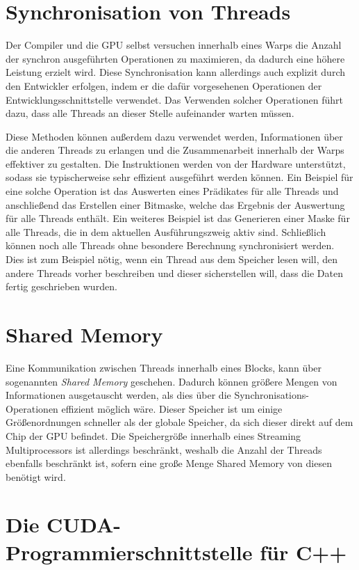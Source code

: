 \section{Synchronisation von Threads}

Der Compiler und die GPU selbst versuchen innerhalb eines Warps die Anzahl der synchron ausgeführten Operationen zu maximieren, da dadurch eine höhere Leistung erzielt wird. \cite{Nickolls2009}
Diese Synchronisation kann allerdings auch explizit durch den Entwickler erfolgen, indem er die dafür vorgesehenen Operationen der Entwicklungsschnittstelle verwendet.
Das Verwenden solcher Operationen führt dazu, dass alle Threads an dieser Stelle aufeinander warten müssen.

Diese Methoden können außerdem dazu verwendet werden, Informationen über die anderen Threads zu erlangen und die Zusammenarbeit innerhalb der Warps effektiver zu gestalten.
Die Instruktionen werden von der Hardware unterstützt, sodass sie typischerweise sehr effizient ausgeführt werden können.
Ein Beispiel für eine solche Operation ist das Auswerten eines Prädikates für alle Threads und anschließend das Erstellen einer Bitmaske, welche das Ergebnis der Auswertung für alle Threads enthält.
Ein weiteres Beispiel ist das Generieren einer Maske für alle Threads, die in dem aktuellen Ausführungszweig aktiv sind.
Schließlich können noch alle Threads ohne besondere Berechnung synchronisiert werden.
Dies ist zum Beispiel nötig, wenn ein Thread aus dem Speicher lesen will, den andere Threads vorher beschreiben und dieser sicherstellen will, dass die Daten fertig geschrieben wurden. \cite{Lin2018}

\section{Shared Memory}

Eine Kommunikation zwischen Threads innerhalb eines Blocks, kann über sogenannten \emph{Shared Memory} geschehen.
Dadurch können größere Mengen von Informationen ausgetauscht werden, als dies über die Synchronisations-Operationen effizient möglich wäre.
Dieser Speicher ist um einige Größenordnungen schneller als der globale Speicher, da sich dieser direkt auf dem Chip der GPU befindet. \cite{Harris2013}
Die Speichergröße innerhalb eines Streaming Multiprocessors ist allerdings beschränkt, weshalb die Anzahl der Threads ebenfalls beschränkt ist, sofern eine große Menge Shared Memory von diesen benötigt wird.

\section{Die CUDA-Programmierschnittstelle für C++}

